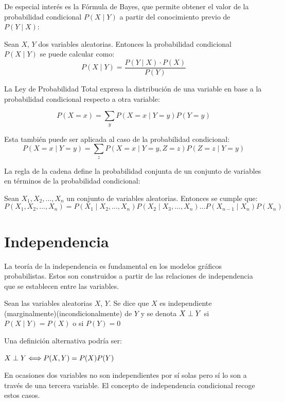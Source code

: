 De especial interés es la Fórmula de Bayes, que permite obtener el valor de la probabilidad condicional $P(X \mid Y)$ a partir del conocimiento previo de $P(Y \mid X)$: 

\begin{theorem}
	Sean $X$, $Y$ dos variables aleatorias. Entonces la probabilidad condicional $P(X \mid Y)$ se puede calcular como:
	\[ P(X \mid Y) = \frac{P(Y \mid X ) \cdot P(X)}{P(Y)}  \]
\end{theorem}

La Ley de Probabilidad Total expresa la distribución de una variable en base a la probabilidad condicional respecto a otra variable:
\begin{theorem}	
	\[ P(X=x) = \sum_{y} P(X=x \mid Y=y)P(Y=y)\]
\end{theorem}
Esta también puede ser aplicada al caso de la probabilidad condicional:
\[P(X=x \mid Y=y) = \sum_{z}P(X=x \mid Y=y,Z=z)P(Z=z \mid Y=y)\]

La regla de la cadena define la probabilidad conjunta de un conjunto de variables en términos de la probabilidad condicional: 
\begin{theorem}
	Sean $X_1, X_2, ..., X_n$ un conjunto de variables aleatorias. Entonces se cumple que:
	\[P(X_1,X_2,...,X_n)=P(X_1 \mid X_2,...,X_n)P(X_2 \mid X_3,...,X_n)...P(X_{n-1} \mid X_n)P(X_n)\]
\end{theorem}

\section{Independencia}
La teoría de la independencia es fundamental en los modelos gráficos probabilistas. Estos son construidos a partir de las relaciones de independencia que se establecen entre las variables. 

\begin{dfn}[Independencia]
	Sean las variables aleatorias $X$, $Y$. Se dice que $X$ es independiente (marginalmente)(incondicionalmente) de $Y$ y se denota $X \perp Y$ si $P(X \mid Y) = P(X)$ o si $P(Y)=0$
\end{dfn}
Una definición alternativa podría ser:
\begin{prop}
	$X \perp Y \Longleftrightarrow P(X,Y)=P(X)P(Y)$
\end{prop}

En ocasiones dos variables no son independientes por sí solas pero sí lo son a través de una tercera variable. El concepto de independencia condicional recoge estos casos.


